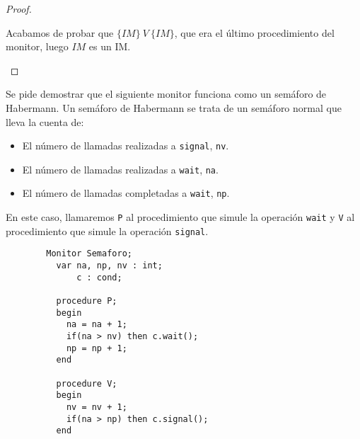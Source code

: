 \begin{ejemplo}
\begin{proof}
\begin{enumerate}
                Acabamos de probar que $\{IM\}\ V\ \{IM\}$, que era el último procedimiento del monitor, luego $IM$ es un IM\@.
        \end{enumerate}
    \end{proof}
\end{ejemplo}

\begin{ejercicio*}
    Se pide demostrar que el siguiente monitor funciona como un semáforo de Habermann. Un semáforo de Habermann se trata de un semáforo normal que lleva la cuenta de:
    \begin{itemize}
        \item El número de llamadas realizadas a \verb|signal|, \verb|nv|.
        \item El número de llamadas realizadas a \verb|wait|, \verb|na|.
        \item El número de llamadas completadas a \verb|wait|, \verb|np|.
    \end{itemize}
    En este caso, llamaremos \verb|P| al procedimiento que simule la operación \verb|wait| y \verb|V| al procedimiento que simule la operación \verb|signal|.
    
    \begin{verbatim}
        Monitor Semaforo;
          var na, np, nv : int;
              c : cond;

          procedure P;
          begin
            na = na + 1;
            if(na > nv) then c.wait();
            np = np + 1;
          end

          procedure V;
          begin
            nv = nv + 1;
            if(na > np) then c.signal();
          end


\end{verbatim}
\end{ejercicio*}
